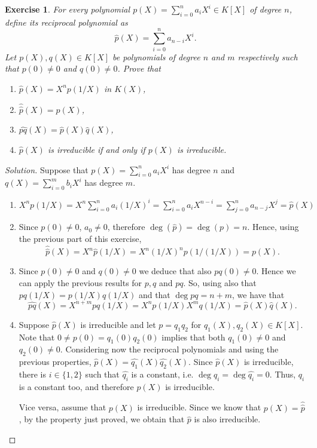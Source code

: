 \documentclass[a4paper,10pt,reqno]{amsart}
\newtheorem{ex}{Exercise}[section]
\newenvironment{sol}
  {\renewcommand\qedsymbol{$\blacksquare$}\begin{proof}[Solution]}
  {\end{proof}}
\begin{document}
\begin{ex}
    
    For every polynomial $p(X)=\sum_{i=0}^n a_iX^i\in K[X]$ of degree $n$,
    define its \emph{reciprocal polynomial} as
    \[
    \widehat{p}(X)=\sum_{i=0}^n a_{n-i}X^i.
    \]
    Let $p(X),q(X)\in K[X]$ be polynomials of degree $n$ and $m$ respectively such that $p(0)\neq 0$ and $q(0)\neq 0$. Prove that
    \begin{enumerate}[label=(\roman*)]
    \item $\widehat{p}(X)=X^np(1/X)$ in $K(X)$,
    \item $\widehat{ \widehat{p}}(X)=p(X)$,
    \item $\widehat{pq}(X)=\widehat{p}(X)\widehat{q}(X)$,
    \item $\widehat{p}(X)$ is irreducible if and only if $p(X)$ is irreducible.
    \end{enumerate}
\end{ex}

\begin{sol}
Suppose that $p(X)=\sum_{i=0}^n a_iX^i$ has degree $n$ and $q(X)=\sum_{i=0}^m b_iX^i$ has degree $m$.
    \begin{enumerate}[label=(\roman*)]
    \item 
    $X^np(1/X)=X^n\sum_{i=0}^n a_i(1/X)^i=\sum_{i=0}^n a_iX^{n-i}=\sum_{j=0}^n a_{n-j}X^j=\widehat{p}(X)$
    \item Since $p(0)\neq 0$, $a_0\neq 0$, therefore $\deg(\widehat{p})=\deg(p)=n$. Hence, using the previous part of this exercise,
    \[
    \widehat{\widehat{p}}(X)=X^n\widehat{p}(1/X)=X^n(1/X)^np(1/(1/X))=p(X).
    \]    
    \item Since $p(0)\neq 0$ and $q(0)\neq 0$ we deduce that also $pq(0)\neq 0$.
    Hence we can apply the previous results for $p,q$ and $pq$. 
    So, using also that $pq(1/X)=p(1/X)q(1/X)$ and that $\deg{pq}=n+m$, we have that
    \[
    \widehat{pq}(X)=X^{n+m}pq(1/X)=X^np(1/X)X^mq(1/X)=\widehat{p}(X)\widehat{q}(X).
    \]
    \item Suppose $\widehat{p}(X)$ is irreducible and let $p=q_1q_2$ for
    $q_1(X),q_2(X)\in K[X]$.
    Note that $0\neq p(0)=q_1(0)q_2(0)$ implies that both $q_1(0)\neq 0$ and $q_2(0)\neq 0$.
    Considering now the reciprocal polynomials and using the previous properties,
    $\widehat{p}(X)=\widehat{q_1}(X)\widehat{q_2}(X)$.
    Since $\widehat{p}(X)$ is irreducible, there is $i\in\{1,2\}$ such that $\widehat{q_i}$ 
    is a constant, i.e. $\deg{q_i}=\deg{\widehat{q_i}}=0$.
    Thus, $q_i$ is a constant too, and therefore $p(X)$ is irreducible.

    Vice versa, assume that $p(X)$ is irreducible. Since we know that $p(X)=\widehat{\widehat{p}}$, by the property just proved, we obtain that $\widehat{p}$ 
    is also irreducible.
    \end{enumerate}
\end{sol}
\end{document}
